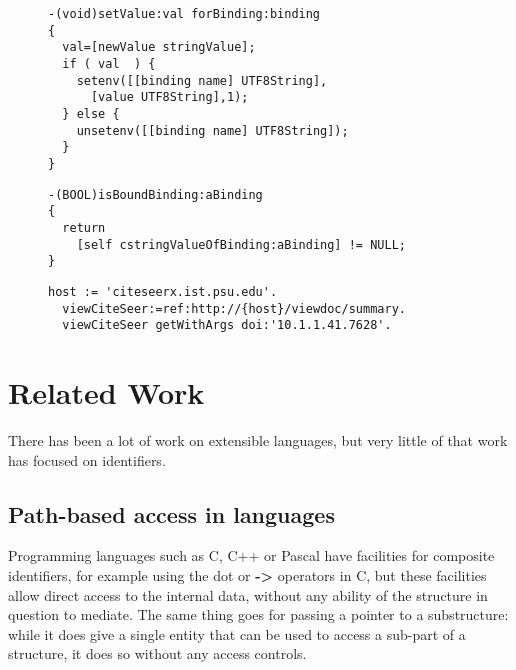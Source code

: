 \documentclass[preprint,authoryear]{acm_proc_article-sp}
\begin{document}
\begin{figure}[htbp]
\begin{lstlisting}[style=L,label=setvalue-env,caption=Set value in env: scheme.]
-(void)setValue:val forBinding:binding
{
  val=[newValue stringValue];
  if ( val  ) {
    setenv([[binding name] UTF8String],
      [value UTF8String],1);
  } else {
    unsetenv([[binding name] UTF8String]);
  }
}
\end{lstlisting}
\end{figure}


\begin{figure}[htbp]
\begin{lstlisting}[style=L,label=hasValue-env,caption=Checking for presence of value in env: scheme.]
-(BOOL)isBoundBinding:aBinding
{
  return 
    [self cstringValueOfBinding:aBinding] != NULL;
}
\end{lstlisting}
\end{figure}


\begin{figure}[htbp]
\begin{lstlisting}[style=L,label=url-args,caption=URL arguments via reference and higher order message.]
  host := 'citeseerx.ist.psu.edu'.
  viewCiteSeer:=ref:http://{host}/viewdoc/summary.
  viewCiteSeer getWithArgs doi:'10.1.1.41.7628'.
\end{lstlisting}
\end{figure}


\section{Related Work}
\label{related-work}

There has been a lot of work on extensible languages, but very little of that work 
has focused on identifiers.  

\subsection{Path-based access in languages}

Programming languages such as C, C++ or Pascal have facilities for composite
identifiers, for example using the dot or {\bf -> } operators in C, but these facilities allow
direct access to the internal data, without any ability of the structure in question to 
mediate.  The same thing goes for passing a pointer to a substructure:  while it
does give a single entity that can be used to access a sub-part of a structure, it
does so without any access controls.
\end{document}
